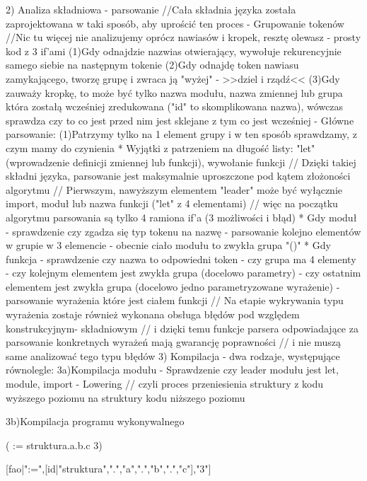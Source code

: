 \documentclass[11pt,oneside,a4paper,titlepage,onecolumn]{article}
\begin{document}
2) Analiza składniowa - parsowanie
//Cała składnia języka została zaprojektowana w taki sposób, aby uprościć ten proces
 - Grupowanie tokenów //Nic tu więcej nie analizujemy oprócz nawiasów i kropek, resztę olewasz - prosty kod z 3 if'ami
   (1)Gdy odnajdzie nazwias otwierający, wywołuje rekurencyjnie samego siebie na następnym tokenie 
   (2)Gdy odnajdę token nawiasu zamykającego, tworzę grupę i zwraca ją "wyżej" - >>dziel i rządź<< 
   (3)Gdy zauważy kropkę, to może być tylko nazwa modułu, nazwa zmiennej lub grupa która zostałą wcześniej zredukowana ("id" to skomplikowana nazwa), wówczas sprawdza czy to co jest przed nim jest sklejane z tym co jest wcześniej
 - Główne parsowanie:
   (1)Patrzymy tylko na 1 element grupy i w ten sposób sprawdzamy, z czym mamy do czynienia
     * Wyjątki z patrzeniem na długość listy: "let" (wprowadzenie definicji zmiennej lub funkcji), wywołanie funkcji
   // Dzięki takiej składni języka, parsowanie jest maksymalnie uproszczone pod kątem złożoności algorytmu
   // Pierwszym, nawyższym elementem "leader" może być wyłącznie import, moduł lub nazwa funkcji ("let" z 4 elementami)
   // więc na początku algorytmu parsowania są tylko 4 ramiona if'a (3 możliwości i błąd)
     * Gdy moduł - sprawdzenie czy zgadza się typ tokenu na nazwę
                 - parsowanie kolejno elementów w grupie w 3 elemencie
                 - obecnie ciało modułu to zwykła grupa "()"
     * Gdy funkcja - sprawdzenie czy nazwa to odpowiedni token
                   - czy grupa ma 4 elementy
                   - czy kolejnym elementem jest zwykła grupa (docelowo parametry)
                   - czy ostatnim elementem jest zwykła grupa (docelowo jedno parametryzowane wyrażenie)
                   - parsowanie wyrażenia które jest ciałem funkcji
   // Na etapie wykrywania typu wyrażenia zostaje również wykonana obsługa błędów pod względem konstrukcyjnym- składniowym
   // i dzięki temu funkcje parsera odpowiadające za parsowanie konkretnych wyrażeń mają gwarancję poprawności
   // i nie muszą same analizować tego typu błędów
3) Kompilacja - dwa rodzaje, występujące równolegle:
3a)Kompilacja modułu
 - Sprawdzenie czy leader modułu jest let, module, import
 - Lowering // czyli proces przeniesienia struktury z kodu wyższego poziomu na struktury kodu niższego poziomu
 
3b)Kompilacja programu wykonywalnego 
 
( := struktura.a.b.c 3)

[fao|":=",[id|"struktura",".","a",".","b",".","c"],"3"]
\end{document}
